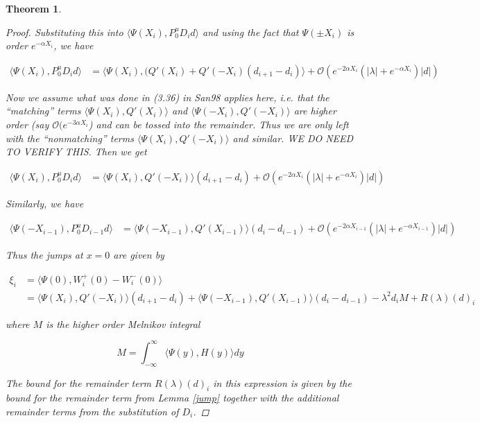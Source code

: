 \documentclass[12pt]{article}
\newtheorem{theorem}{Theorem}
\begin{document}
\begin{theorem}
\begin{proof}
Substituting this into $\langle \Psi(X_i), P^u_0 D_i d \rangle$ and using the fact that $\Psi(\pm X_i)$ is order $e^{-\alpha X_i}$, we have

\begin{align*}
\langle \Psi(X_i), P^u_0 D_i d \rangle &= \langle \Psi(X_i), (Q'(X_i) + Q'(-X_i)(d_{i+1} - d_i ) \rangle + \mathcal{O} \left( e^{-2 \alpha X_i} \left( |\lambda| +  e^{-\alpha X_i}  \right) |d| \right)
\end{align*}

Now we assume what was done in (3.36) in San98 applies here, i.e. that the ``matching'' terms $\langle \Psi(X_i), Q'(X_i) \rangle$ and $\langle \Psi(-X_i), Q'(-X_i) \rangle$ are higher order (say $\mathcal{O}(e^{-3 \alpha X_i}$) and can be tossed into the remainder. Thus we are only left with the ``nonmatching'' terms $\langle \Psi(X_i), Q'(-X_i) \rangle$ and similar. WE DO NEED TO VERIFY THIS. Then we get

\begin{align*}
\langle \Psi(X_i), P^u_0 D_i d \rangle &= \langle \Psi(X_i), Q'(-X_i) \rangle (d_{i+1} - d_i ) + \mathcal{O} \left( e^{-2 \alpha X_i} \left( |\lambda| +  e^{-\alpha X_i}  \right) |d| \right)
\end{align*}

Similarly, we have

\begin{align*}
\langle \Psi(-X_{i-1}), P^u_0 D_{i-1} d \rangle &= \langle \Psi(-X_{i-1}), Q'(X_{i-1}) \rangle (d_i - d_{i-1} ) + \mathcal{O} \left( e^{-2 \alpha X_{i-1}} \left( |\lambda| +  e^{-\alpha X_{i-1}}  \right) |d| \right)
\end{align*}

Thus the jumps at $x = 0$ are given by

\begin{align*}
\xi_i &= \langle \Psi(0), W_i^+(0) - W_i^-(0) \rangle \\
&= \langle \Psi(X_i), Q'(-X_i) \rangle (d_{i+1} - d_i ) + \langle \Psi(-X_{i-1}), Q'(X_{i-1}) \rangle (d_i - d_{i-1} ) - \lambda^2 d_i M + R(\lambda)(d)_i
\end{align*}

where $M$ is the higher order Melnikov integral

\[
M = \int_{-\infty}^\infty \langle \Psi(y), H(y) \rangle dy
\]

The bound for the remainder term $R(\lambda)(d)_i$ in this expression is given by the bound for the remainder term from Lemma \ref{jump} together with the additional remainder terms from the substitution of $D_i$.


\end{proof}
\end{theorem}
\end{document}
